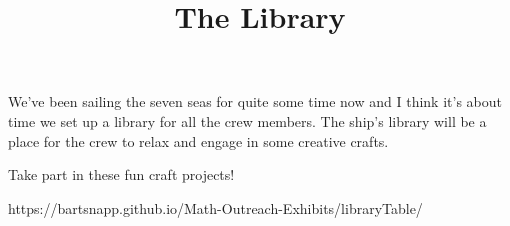 \documentclass{../exhibit}
\title{The Library}
\begin{document}
\begin{context} We've been sailing the seven seas for quite some time
now and I think it's about time we set up a library for all the crew
members. The ship's library will be a place for the crew to relax and
engage in some creative crafts.
\end{context}

\begin{directions} Take part in these fun craft projects!
\end{directions}

\begin{example}
\end{example}

\begin{mathConnections}
  https://bartsnapp.github.io/Math-Outreach-Exhibits/libraryTable/
\end{mathConnections}
\end{document}
